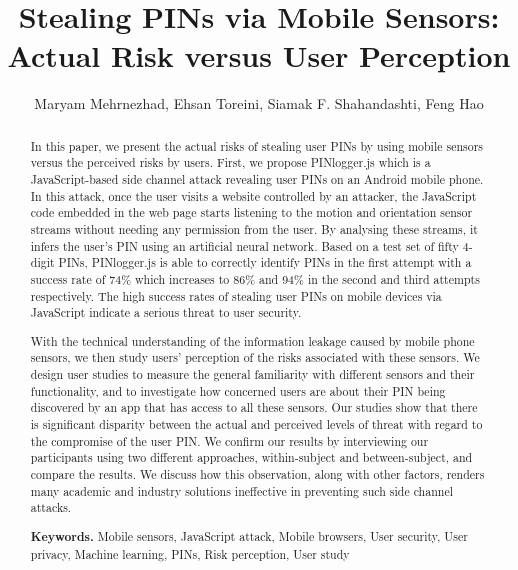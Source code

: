 \documentclass[10pt,twocolumn]{article}
\title{Stealing PINs via Mobile Sensors: \\Actual Risk versus User Perception}
\author{Maryam Mehrnezhad, Ehsan Toreini, Siamak F. Shahandashti, Feng Hao}
\affil{School of Computing Science, Newcastle University, Newcastle upon Tyne, UK}
\date{}
\begin{document}
\maketitle

\begin{abstract}
In this paper, we present the actual risks of stealing user PINs by using mobile sensors versus the perceived risks by users. First, we propose PINlogger.js which is a JavaScript-based side channel attack revealing user PINs on an Android mobile phone. In this attack, once the user visits a website controlled by an attacker, the JavaScript code embedded in the web page starts listening to the motion and orientation sensor streams without needing any permission from the user. By analysing these streams, it infers the user's PIN using an artificial neural network. Based on a test set of fifty 4-digit PINs, PINlogger.js is able to correctly identify PINs in the first attempt with a success rate of 74\% which increases to 86\% and 94\% in the second and third attempts respectively. 
The high success rates of stealing user PINs on mobile devices via JavaScript indicate a serious threat to user security. 

With the technical understanding of the information leakage caused by mobile phone sensors, we then study users' perception of the risks associated with these sensors. We design user studies to measure the general familiarity with different sensors and their functionality, and to investigate how concerned users are about their PIN being discovered by an app that has access to all these sensors. Our studies show that there is significant disparity between the actual and perceived levels of threat with regard to the compromise of the user PIN. We confirm our results by interviewing our participants using two different approaches, within-subject and between-subject, and compare the results. We discuss how this observation, along with other factors, renders many academic and industry solutions ineffective in preventing such side channel attacks. 

\textbf{Keywords.} Mobile sensors, JavaScript attack, Mobile browsers, User security, User privacy, Machine learning, PINs, Risk perception, User study
\end{abstract}
\end{document}
